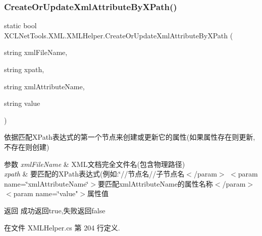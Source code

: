 \subsubsection{\texorpdfstring{Create\+Or\+Update\+Xml\+Attribute\+By\+X\+Path()}{CreateOrUpdateXmlAttributeByXPath()}}
{\footnotesize\ttfamily static bool X\+C\+L\+Net\+Tools.\+X\+M\+L.\+X\+M\+L\+Helper.\+Create\+Or\+Update\+Xml\+Attribute\+By\+X\+Path (\begin{DoxyParamCaption}\item[{string}]{xml\+File\+Name,  }\item[{string}]{xpath,  }\item[{string}]{xml\+Attribute\+Name,  }\item[{string}]{value }\end{DoxyParamCaption})\hspace{0.3cm}{\ttfamily [static]}}



依据匹配\+X\+Path表达式的第一个节点来创建或更新它的属性(如果属性存在则更新,不存在则创建) 


\begin{DoxyParams}{参数}
{\em xml\+File\+Name} & X\+M\+L文档完全文件名(包含物理路径)\\
\hline
{\em xpath} & 要匹配的\+X\+Path表达式(例如\+:\char`\"{}//节点名//子节点名$<$/param$>$
$<$param name=\char`\"{}xml\+Attribute\+Name\char`\"{}$>$要匹配xml\+Attribute\+Name的属性名称$<$/param$>$
$<$param name=\char`\"{}value"$>$属性值\\
\hline
\end{DoxyParams}
\begin{DoxyReturn}{返回}
成功返回true,失败返回false
\end{DoxyReturn}


在文件 X\+M\+L\+Helper.\+cs 第 204 行定义.

\mbox{\label{class_x_c_l_net_tools_1_1_x_m_l_1_1_x_m_l_helper_a770d2342df55e3a414830e1d1842dea8}} 
